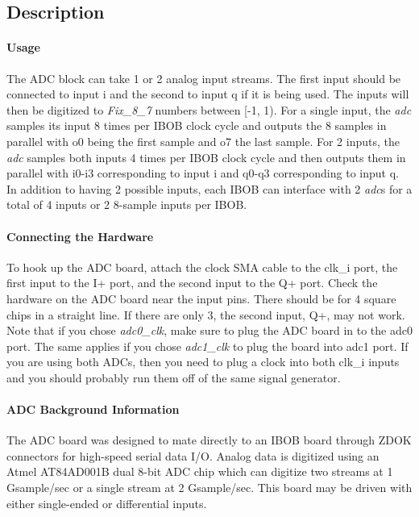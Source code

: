 \documentclass{article}
\newcommand{\BlockDesc}[1]{\subsection*{Description}#1}
\begin{document}
\BlockDesc{
\paragraph{Usage}
The ADC block can take 1 or 2 analog input streams. The first input should be connected to input i and the second to input q if it is being used. The inputs will then be digitized to \textit{Fix\_8\_7} numbers between [-1, 1). For a single input, the \textit{adc} samples its input 8 times per IBOB clock cycle and outputs the 8 samples in parallel with o0 being the first sample and o7 the last sample. For 2 inputs, the \textit{adc} samples both inputs 4 times per IBOB clock cycle and then outputs them in parallel with i0-i3 corresponding to input i and q0-q3 corresponding to input q. In addition to having 2 possible inputs, each IBOB can interface with 2 \textit{adc}s for a total of 4 inputs or 2 8-sample inputs per IBOB. 

\paragraph{Connecting the Hardware}
To hook up the ADC board, attach the clock SMA cable to the clk\_i port, the first input to the I+ port, and the second input to the Q+ port. Check the hardware on the ADC board near the input pins. There should be for 4 square chips in a straight line. If there are only 3, the second input, Q+, may not work. Note that if you chose \textit{adc0\_clk}, make sure to plug the ADC board in to the adc0 port. The same applies if you chose \textit{adc1\_clk} to plug the board into adc1 port. If you are using both ADCs, then you need to plug a clock into both clk\_i inputs and you should probably run them off of the same signal generator. 

\paragraph{ADC Background Information}
The ADC board was designed to mate directly to an IBOB board through ZDOK connectors for high-speed serial data I/O. Analog data is digitized using an Atmel AT84AD001B dual 8-bit ADC chip which can digitize two streams at 1 Gsample/sec or a single stream at 2 Gsample/sec. This board may be driven with either single-ended or differential inputs. 

}

 
\end{document}
